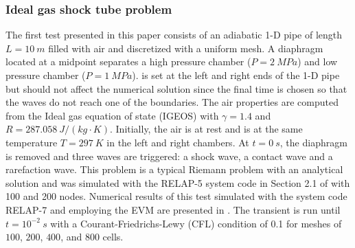 \documentclass{inputs/mc2015}
\begin{document}
\subsubsection{Ideal gas shock tube problem} \label{sec:air-1-phase-shock-tube}
%
The first test presented in this paper consists of an adiabatic 1-D pipe of length $L=10 \ m$ filled with air and discretized with a uniform mesh.  A diaphragm located at a midpoint separates a high pressure chamber ($P=2 \ MPa$) and low pressure chamber ($P=1 \ MPa$).  is set at the left and right ends of the 1-D pipe but should not affect the numerical solution since the final time is chosen so that the waves do not reach one of the boundaries. The air properties are computed from the Ideal gas equation of state (IGEOS) with $\gamma=1.4$ and $R=287.058\ J/(kg \cdot K)$. Initially, the air is at rest and is at the same temperature $T=297 \ K$ in the left and right chambers. At $t = 0 \ s$, the diaphragm is removed and three waves are triggered: a shock wave, a contact wave and a rarefaction wave. This problem is a typical Riemann problem with an analytical solution and was simulated with the RELAP-5 system code in Section 2.1 of \cite{Sokolowski-Koszela} with 100 and 200 nodes. Numerical results of this test simulated with the system code RELAP-7 and employing the EVM are presented in . The transient is run until $t=10^{-2} \ s$ with a Courant-Friedrichs-Lewy (CFL) condition of 0.1 for meshes of $100$, $200$, $400$, and $800$ cells.  
%
\end{document}

